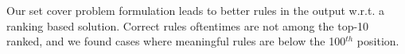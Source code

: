 \noindent {} Our set cover problem formulation leads to better rules in the output w.r.t. a ranking based solution. Correct rules oftentimes are not among the top-10 ranked, and we found cases where meaningful rules are below the 100$^{th}$ position.
	

%
%	
